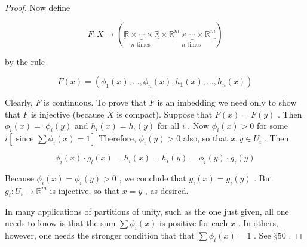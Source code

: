 \begin{proof}
Now define

\[
F : X \rightarrow  \left( {\underset{n\text{ times }}{\underbrace{\mathbb{R} \times  \cdots  \times  \mathbb{R}}} \times  \underset{n\text{ times }}{\underbrace{{\mathbb{R}}^{m} \times  \cdots  \times  {\mathbb{R}}^{m}}}}\right)
\]

by the rule

\[
F\left( x\right)  = \left( {{\phi }_{1}\left( x\right) ,\ldots ,{\phi }_{n}\left( x\right) ,{h}_{1}\left( x\right) ,\ldots ,{h}_{n}\left( x\right) }\right)
\]

Clearly, \(F\) is continuous. To prove that \(F\) is an imbedding we need only to show that \(F\) is injective (because \(X\) is compact). Suppose that \(F\left( x\right)  = F\left( y\right)\) . Then \({\phi }_{i}\left( x\right)  =\)  \({\phi }_{i}\left( y\right)\) and \({h}_{i}\left( x\right)  = {h}_{\iota }\left( y\right)\) for all \(i\) . Now \({\phi }_{i}\left( x\right)  > 0\) for some \(i\left\lbrack  {\text{ since }\sum {\phi }_{i}\left( x\right)  = 1}\right\rbrack\) Therefore, \({\phi }_{i}\left( y\right)  > 0\) also, so that \(x,y \in  {U}_{i}\) . Then

\[
{\phi }_{i}\left( x\right)  \cdot  {g}_{l}\left( x\right)  = {h}_{i}\left( x\right)  = {h}_{i}\left( y\right)  = {\phi }_{i}\left( y\right)  \cdot  {g}_{i}\left( y\right)
\]

Because \({\phi }_{i}\left( x\right)  = {\phi }_{i}\left( y\right)  > 0\) , we conclude that \({g}_{i}\left( x\right)  = {g}_{i}\left( y\right)\) . But \({g}_{i} : {U}_{i} \rightarrow  {\mathbb{R}}^{m}\) is injective, so that \(x = y\) , as desired.

In many applications of partitions of unity, such as the one just given, all one needs to know is that the sum \(\sum {\phi }_{i}\left( x\right)\) is positive for each \(x\) . In others, however, one needs the stronger condition that that \(\sum {\phi }_{i}\left( x\right)  = 1\) . See \(§{50}\) .
\end{proof}

